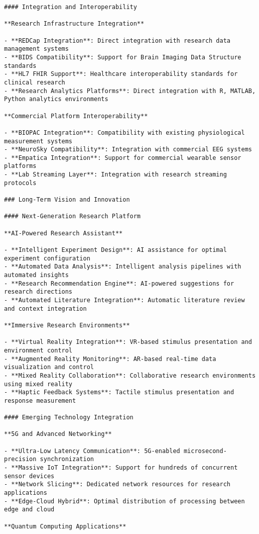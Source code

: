 \documentclass[12pt,a4paper]{report}
\begin{document}
\begin{verbatim}
#### Integration and Interoperability

**Research Infrastructure Integration**

- **REDCap Integration**: Direct integration with research data management systems
- **BIDS Compatibility**: Support for Brain Imaging Data Structure standards
- **HL7 FHIR Support**: Healthcare interoperability standards for clinical research
- **Research Analytics Platforms**: Direct integration with R, MATLAB, Python analytics environments

**Commercial Platform Interoperability**

- **BIOPAC Integration**: Compatibility with existing physiological measurement systems
- **NeuroSky Compatibility**: Integration with commercial EEG systems
- **Empatica Integration**: Support for commercial wearable sensor platforms
- **Lab Streaming Layer**: Integration with research streaming protocols

### Long-Term Vision and Innovation

#### Next-Generation Research Platform

**AI-Powered Research Assistant**

- **Intelligent Experiment Design**: AI assistance for optimal experiment configuration
- **Automated Data Analysis**: Intelligent analysis pipelines with automated insights
- **Research Recommendation Engine**: AI-powered suggestions for research directions
- **Automated Literature Integration**: Automatic literature review and context integration

**Immersive Research Environments**

- **Virtual Reality Integration**: VR-based stimulus presentation and environment control
- **Augmented Reality Monitoring**: AR-based real-time data visualization and control
- **Mixed Reality Collaboration**: Collaborative research environments using mixed reality
- **Haptic Feedback Systems**: Tactile stimulus presentation and response measurement

#### Emerging Technology Integration

**5G and Advanced Networking**

- **Ultra-Low Latency Communication**: 5G-enabled microsecond-precision synchronization
- **Massive IoT Integration**: Support for hundreds of concurrent sensor devices
- **Network Slicing**: Dedicated network resources for research applications
- **Edge-Cloud Hybrid**: Optimal distribution of processing between edge and cloud

**Quantum Computing Applications**


\end{verbatim}
\end{document}
